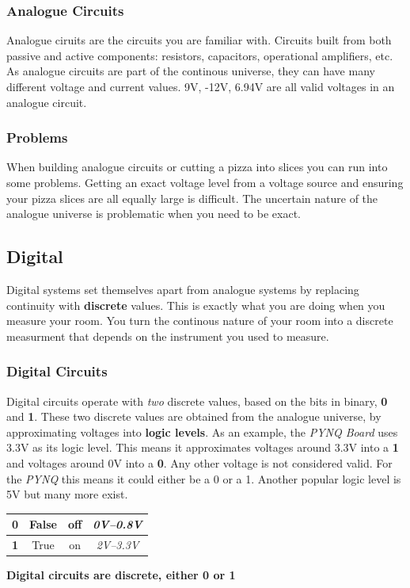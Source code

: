 \documentclass[12pt, a4paper, oneside]{memoir}
\newcommand{\attention}[1]{\begin{center}\colorbox{attention}{\textbf{#1}}\end{center}}
\begin{document}
\subsubsection*{Analogue Circuits}
Analogue ciruits are the circuits you are familiar with. Circuits built from both passive and active components: resistors, capacitors, operational amplifiers, etc.
As analogue circuits are part of the continous universe, they can have many different voltage and current values. 9V, -12V, 6.94V are all valid voltages in an analogue circuit.

\subsubsection*{Problems}
When building analogue circuits or cutting a pizza into slices you can run into some problems. Getting an exact voltage level from a voltage source and ensuring your pizza slices are all equally large is difficult.
The uncertain nature of the analogue universe is problematic when you need to be exact.

\subsection*{Digital}
Digital systems set themselves apart from analogue systems by replacing continuity with \textbf{discrete} values.
This is exactly what you are doing when you measure your room.
You turn the continous nature of your room into a discrete measurment that depends on the instrument you used to measure.

\subsubsection*{Digital Circuits}
Digital circuits operate with \textit{two} discrete values, based on the bits in binary, \textbf{0} and \textbf{1}.
These two discrete values are obtained from the analogue universe, by approximating voltages into \textbf{logic levels}. 
As an example, the \textit{PYNQ Board} uses 3.3V as its logic level. This means it approximates voltages around 3.3V into a \textbf{1} and voltages around 0V into a \textbf{0}.
Any other voltage is not considered valid. For the \textit{PYNQ} this means it could either be a 0 or a 1. Another popular logic level is 5V but many more exist.

\begin{center}
  \begin{tabular}{cccc}
    \textbf{0} & False & off & \textit{0V--0.8V} \\
    \midrule
    \textbf{1} & True & on & \textit{2V--3.3V} \\
  \end{tabular}
\end{center}
\attention{Digital circuits are discrete, either 0 or 1}
\end{document}
